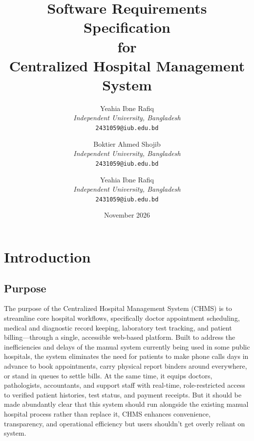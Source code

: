 \documentclass[11pt,a4paper]{article}
\title{\textbf{Software Requirements Specification}\\ \large for \\ \textbf{Centralized Hospital Management System}}
\author{
    Yeahia Ibne Rafiq \\
    \textit{Independent University, Bangladesh}  \\
    \texttt{2431059@iub.edu.bd}
    \and
    Boktier Ahmed Shojib \\
    \textit{Independent University, Bangladesh}  \\
    \texttt{2431059@iub.edu.bd}
    \and
    Yeahia Ibne Rafiq \\
    \textit{Independent University, Bangladesh}  \\
    \texttt{2431059@iub.edu.bd}
    }
\date{November 2026}
\begin{document}
\maketitle
\thispagestyle{empty}
\newpage

\tableofcontents
\newpage

\section{Introduction}

\subsection{Purpose}
The purpose of the Centralized Hospital Management System (CHMS) is to streamline core hospital workflows, specifically doctor appointment scheduling, medical and diagnostic record keeping, laboratory test tracking, and patient billing—through a single, accessible web-based platform. Built to address the inefficiencies and delays of the manual system currently being used in some public hospitals, the system eliminates the need for patients to make phone calls days in advance to book appointments, carry physical report binders around everywhere, or stand in queues to settle bills. At the same time, it equips doctors, pathologists, accountants, and support staff with real-time, role-restricted access to verified patient histories, test status, and payment receipts. But it should be made abundantly clear that this system should run alongside the existing manual hospital process rather than replace it, CHMS enhances convenience, transparency, and operational efficiency but users shouldn't get overly reliant on system.
\end{document}
